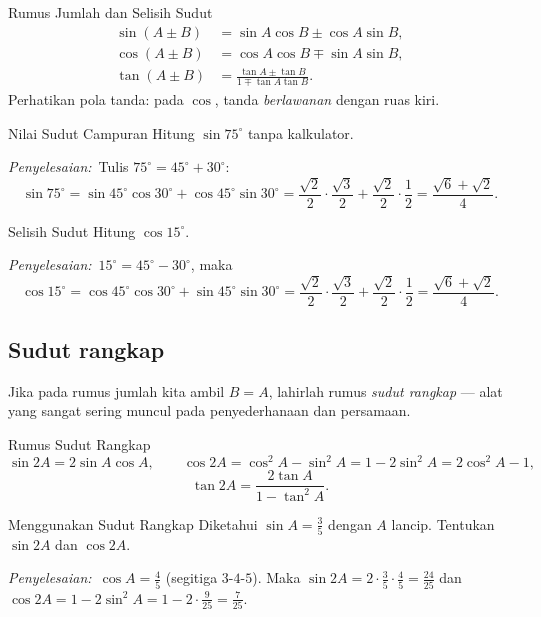 \documentclass[11pt,a4paper]{report}
\theoremstyle{gaya}
\newcommand{\jawab}{\par\smallskip\noindent\textit{\textcolor{oranye}{Penyelesaian:}}\ }
\begin{document}
\begin{konsep}{Rumus Jumlah dan Selisih Sudut}
\[
\begin{aligned}
\sin(A\pm B)&=\sin A\cos B\pm\cos A\sin B,\\
\cos(A\pm B)&=\cos A\cos B\mp\sin A\sin B,\\
\tan(A\pm B)&=\frac{\tan A\pm\tan B}{1\mp\tan A\tan B}.
\end{aligned}
\]
Perhatikan pola tanda: pada $\cos$, tanda \emph{berlawanan} dengan ruas kiri.
\end{konsep}

\begin{contoh}{Nilai Sudut Campuran}
Hitung $\sin 75^\circ$ tanpa kalkulator.

\jawab Tulis $75^\circ=45^\circ+30^\circ$:
\[
\sin75^\circ=\sin45^\circ\cos30^\circ+\cos45^\circ\sin30^\circ
=\frac{\sqrt2}{2}\cdot\frac{\sqrt3}{2}+\frac{\sqrt2}{2}\cdot\frac12=\frac{\sqrt6+\sqrt2}{4}.
\]
\end{contoh}

\begin{contoh}{Selisih Sudut}
Hitung $\cos15^\circ$.

\jawab $15^\circ=45^\circ-30^\circ$, maka
\[
\cos15^\circ=\cos45^\circ\cos30^\circ+\sin45^\circ\sin30^\circ
=\frac{\sqrt2}{2}\cdot\frac{\sqrt3}{2}+\frac{\sqrt2}{2}\cdot\frac12=\frac{\sqrt6+\sqrt2}{4}.
\]
\end{contoh}

\subsection*{Sudut rangkap}
Jika pada rumus jumlah kita ambil $B=A$, lahirlah rumus \emph{sudut rangkap} --- alat yang sangat sering muncul pada penyederhanaan dan persamaan.

\begin{konsep}{Rumus Sudut Rangkap}
\[
\sin2A=2\sin A\cos A,\qquad
\cos2A=\cos^2 A-\sin^2 A=1-2\sin^2 A=2\cos^2 A-1,
\]
\[
\tan2A=\frac{2\tan A}{1-\tan^2 A}.
\]
\end{konsep}

\begin{contoh}{Menggunakan Sudut Rangkap}
Diketahui $\sin A=\tfrac35$ dengan $A$ lancip. Tentukan $\sin2A$ dan $\cos2A$.

\jawab $\cos A=\tfrac45$ (segitiga $3$-$4$-$5$). Maka $\sin2A=2\cdot\tfrac35\cdot\tfrac45=\tfrac{24}{25}$ dan $\cos2A=1-2\sin^2A=1-2\cdot\tfrac{9}{25}=\tfrac{7}{25}$.
\end{contoh}
\end{document}
